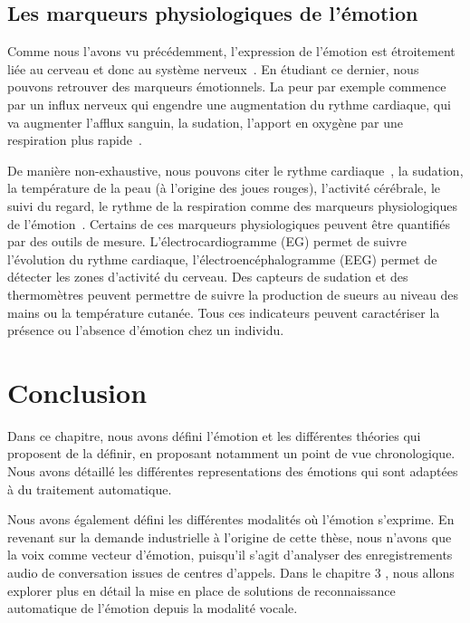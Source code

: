 \subsection{Les marqueurs physiologiques de l'émotion}
Comme nous l'avons vu précédemment, l'expression de l'émotion est étroitement liée au cerveau et donc au système nerveux~\cite{Dantzer2002}. En étudiant ce dernier, nous pouvons retrouver des marqueurs émotionnels. La peur par exemple commence par un influx nerveux qui engendre une augmentation du rythme cardiaque, qui va augmenter l'afflux sanguin, la sudation, l'apport en oxygène par une respiration plus rapide~\cite{Steimer2002}.

De manière non-exhaustive, nous pouvons citer le rythme cardiaque~\cite{Wiens2000}, la sudation, la température de la peau (à l'origine des joues rouges), l'activité cérébrale, le suivi du regard, le rythme de la respiration comme des marqueurs physiologiques de l'émotion~\cite{Maaoui2010,Levenson2003}. Certains de ces marqueurs physiologiques peuvent être quantifiés par des outils de mesure. L'électrocardiogramme (EG) permet de suivre l'évolution du rythme cardiaque, l'électroencéphalogramme (EEG) permet de détecter les zones d'activité du cerveau. Des capteurs de sudation et des thermomètres peuvent permettre de suivre la production de sueurs au niveau des mains ou la température cutanée. Tous ces indicateurs peuvent caractériser la présence ou l'absence d'émotion chez un individu.

\section{Conclusion}
Dans ce chapitre, nous avons défini l'émotion et les différentes théories qui proposent de la définir, en proposant notamment un point de vue chronologique. Nous avons détaillé les différentes representations des émotions qui sont adaptées à du traitement automatique.

Nous avons également défini les différentes modalités où l'émotion s'exprime. En revenant sur la demande industrielle à l'origine de cette thèse, nous n'avons que la voix comme vecteur d'émotion, puisqu'il s'agit d'analyser des enregistrements audio de conversation issues de centres d'appels. Dans le chapitre 3
, nous allons explorer plus en détail la mise en place de solutions de reconnaissance automatique de l'émotion depuis la modalité vocale.
